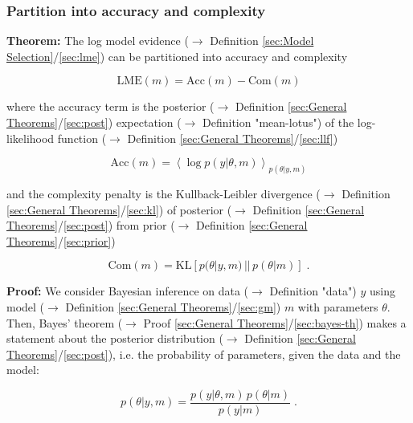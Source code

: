 \documentclass[a4paper,12pt,twoside]{book}
\begin{document}
\subsubsection[\textbf{Partition into accuracy and complexity}]{Partition into accuracy and complexity} \label{sec:lme-anc}
\setcounter{equation}{0}

\textbf{Theorem:} The log model evidence ($\rightarrow$ Definition \ref{sec:Model Selection}/\ref{sec:lme}) can be partitioned into accuracy and complexity

\begin{equation} \label{eq:lme-anc-LME}
\mathrm{LME}(m) = \mathrm{Acc}(m) - \mathrm{Com}(m)
\end{equation}

where the accuracy term is the posterior ($\rightarrow$ Definition \ref{sec:General Theorems}/\ref{sec:post}) expectation ($\rightarrow$ Definition "mean-lotus") of the log-likelihood function ($\rightarrow$ Definition \ref{sec:General Theorems}/\ref{sec:llf})

\begin{equation} \label{eq:lme-anc-Acc}
\mathrm{Acc}(m) = \left\langle \log p(y|\theta,m) \right\rangle_{p(\theta|y,m)}
\end{equation}

and the complexity penalty is the Kullback-Leibler divergence ($\rightarrow$ Definition \ref{sec:General Theorems}/\ref{sec:kl}) of posterior ($\rightarrow$ Definition \ref{sec:General Theorems}/\ref{sec:post}) from prior ($\rightarrow$ Definition \ref{sec:General Theorems}/\ref{sec:prior})

\begin{equation} \label{eq:lme-anc-Com}
\mathrm{Com}(m) = \mathrm{KL} \left[ p(\theta|y,m) \, || \, p(\theta|m) \right] \; .
\end{equation}


\vspace{1em}
\textbf{Proof:} We consider Bayesian inference on data ($\rightarrow$ Definition "data") $y$ using model ($\rightarrow$ Definition \ref{sec:General Theorems}/\ref{sec:gm}) $m$ with parameters $\theta$. Then, Bayes' theorem ($\rightarrow$ Proof \ref{sec:General Theorems}/\ref{sec:bayes-th}) makes a statement about the posterior distribution ($\rightarrow$ Definition \ref{sec:General Theorems}/\ref{sec:post}), i.e. the probability of parameters, given the data and the model:

\begin{equation} \label{eq:lme-anc-AnC-s1}
p(\theta|y,m) = \frac{p(y|\theta,m) \, p(\theta|m)}{p(y|m)} \; .
\end{equation}
\end{document}
